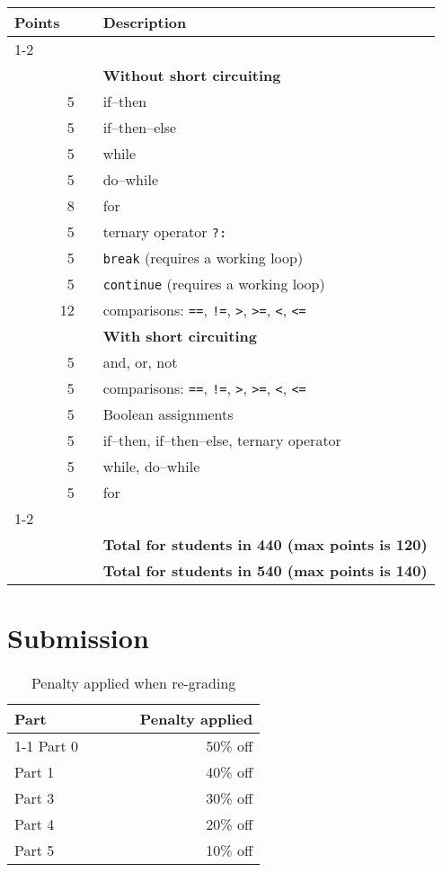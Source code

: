 \documentclass{article}
\makeatletter
\newcommand{\parser}{3}
\newcommand{\typecheck}{4}
\newcommand{\codegen}{5}
\newcommand{\gradeline}{ \cline{1-2} \cline{4-4} ~\\[-1.5ex] }
\newenvironment{gradetable}{\begin{longtable}{@{~~}rrcp{5in}} \multicolumn{2}{l}{\bf Points} & & {\bf Description}\\ \gradeline}{\end{longtable}}
\newcommand{\mainitem}[2]{\pagebreak[2] {\bf #1} &&& {\bf #2}}
\newcommand{\inneritem}[2]{~ & #1 && #2}
\makeatother
\begin{document}
\begin{gradetable}
  \mainitem{55}{Without short circuiting}
  \\[1mm]
  \inneritem{5}{if--then}
  \\[1mm]
  \inneritem{5}{if--then--else}
  \\[1mm]
  \inneritem{5}{while}
  \\[1mm]
  \inneritem{5}{do--while}
  \\[1mm]
  \inneritem{8}{for}
  \\[1mm]
  \inneritem{5}{ternary operator {\tt ?:}}
  \\[1mm]
  \inneritem{5}{{\tt break} (requires a working loop)}
  \\[1mm]
  \inneritem{5}{{\tt continue} (requires a working loop)}
  \\[1mm]
  \inneritem{12}{comparisons: {\tt ==}, {\tt !=}, {\tt >}, {\tt >=}, {\tt <}, {\tt <=} }
  \\[4mm]

  \mainitem{30}{With short circuiting}
  \\[1mm]
  \inneritem{5}{and, or, not}
  \\[1mm]
  \inneritem{5}{comparisons: {\tt ==}, {\tt !=}, {\tt >}, {\tt >=}, {\tt <}, {\tt <=} }
  \\[1mm]
  \inneritem{5}{Boolean assignments}
  \\[1mm]
  \inneritem{5}{if--then, if--then--else, ternary operator}
  \\[1mm]
  \inneritem{5}{while, do--while}
  \\[1mm]
  \inneritem{5}{for}
  \\[4mm]

  \gradeline
  \mainitem{100}{Total for students in 440 (max points is 120)}
  \\
  \mainitem{120}{Total for students in 540 (max points is 140)}
\end{gradetable}


\section{Submission}

\begin{table}[h]
\centering

  \begin{tabular}{lcr}
    {\bf Part} & ~~~~ & {\bf Penalty applied} \\ \cline{1-1}\cline{3-3}
    Part 0 && 50\% off \\
    Part 1 && 40\% off \\
    Part \parser && 30\% off \\
    Part \typecheck && 20\% off \\
    Part \codegen && 10\% off
  \end{tabular}

\caption{Penalty applied when re-grading}
\label{TAB:penalties}
\end{table}
\end{document}
